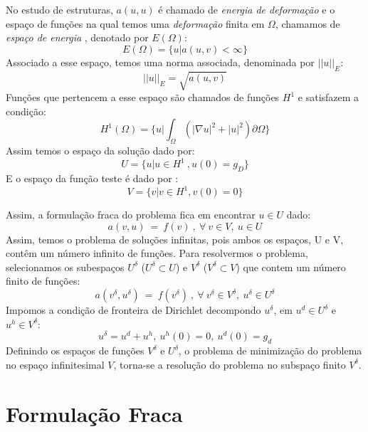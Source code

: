  No estudo de estruturas,  $a(u,u)$ é chamado de \emph{energia de deformação} e o espaço de funções na qual temos uma \emph{deformação} finita em $\Omega$, chamamos de \emph{espaço de energia} , denotado por $E(\Omega)$:
\begin{equation}
 E(\Omega) = \lbrace u | a(u,v) < \infty \rbrace
\end{equation}
  Associado a esse espaço, temos uma norma associada, denominada por $||u||_E$:
\begin{equation}
 ||u||_{E} = \sqrt{a(u,v)}
\end{equation}
 Funções que pertencem a esse espaço são chamados de funções $H^1$ e satisfazem a condição:
 \begin{equation}
 H^1(\Omega) = \bigg\{ u| \int_\Omega (|\nabla u|^2 + |u|^2) \partial \Omega  \bigg\}
 \end{equation}
  Assim temos o espaço da solução dado por:
\begin{equation}
U = \lbrace u| u \in H^1\ , u(0) = g_D  \rbrace
\end{equation}
 E o espaço da função teste é dado por :
\begin{equation}
V = \lbrace v | v \in H^1, v(0)=0 \rbrace
\end{equation}

 Assim, a formulação fraca do problema fica em encontrar $u \in U$ dado:
 \begin{equation}
 a(v,u)\ =\ f(v)\ ,\ \forall\ v \in V,\ u \in U
 \end{equation}
 Assim, temos o problema de soluções infinitas, pois ambos os espaços, U e V, contêm um número infinito de funções. Para resolvermos o problema, selecionamos os subespaços $U^\delta$ ($ U^\delta \subset U$) e $V^\delta$ ($ V^\delta \subset V$) que contem um número finito de funções:
  \begin{equation}
 a(v^\delta,u^\delta)\ =\ f(v^\delta)\ ,\ \forall\ v^\delta \in V^\delta,\ u^\delta \in U^\delta
 \end{equation}
Impomos a condição de fronteira de Dirichlet decompondo $u^\delta$, em $u^d \in U^\delta$ e $u^h \in V^\delta$:
\begin{equation}
 u^\delta = u^d + u^h,\ u^h(0) = 0,\ u^d(0) = g_d
\end{equation}
 Definindo os espaços de funções $V^\delta$ e $U^\delta$, o problema de minimização do problema no espaço infinitesimal $V$, torna-se a resolução do problema no subspaço finito $V^\delta$.
 
\section{Formulação Fraca}
